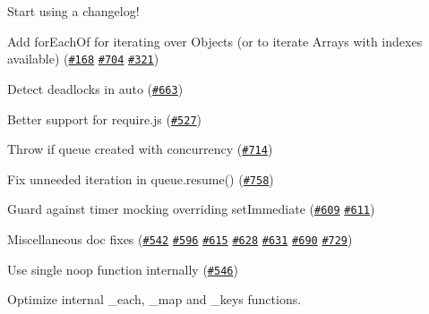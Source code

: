 \begin{DoxyItemize}
\item Start using a changelog!
\item Add {\ttfamily for\+Each\+Of} for iterating over Objects (or to iterate Arrays with indexes available) (\href{https://github.com/caolan/async/issues/168}{\tt \#168} \href{https://github.com/caolan/async/issues/704}{\tt \#704} \href{https://github.com/caolan/async/issues/321}{\tt \#321})
\item Detect deadlocks in {\ttfamily auto} (\href{https://github.com/caolan/async/issues/663}{\tt \#663})
\item Better support for require.\+js (\href{https://github.com/caolan/async/issues/527}{\tt \#527})
\item Throw if queue created with concurrency {} (\href{https://github.com/caolan/async/issues/714}{\tt \#714})
\item Fix unneeded iteration in {\ttfamily queue.\+resume()} (\href{https://github.com/caolan/async/issues/758}{\tt \#758})
\item Guard against timer mocking overriding {\ttfamily set\+Immediate} (\href{https://github.com/caolan/async/issues/609}{\tt \#609} \href{https://github.com/caolan/async/issues/611}{\tt \#611})
\item Miscellaneous doc fixes (\href{https://github.com/caolan/async/issues/542}{\tt \#542} \href{https://github.com/caolan/async/issues/596}{\tt \#596} \href{https://github.com/caolan/async/issues/615}{\tt \#615} \href{https://github.com/caolan/async/issues/628}{\tt \#628} \href{https://github.com/caolan/async/issues/631}{\tt \#631} \href{https://github.com/caolan/async/issues/690}{\tt \#690} \href{https://github.com/caolan/async/issues/729}{\tt \#729})
\item Use single noop function internally (\href{https://github.com/caolan/async/issues/546}{\tt \#546})
\item Optimize internal {\ttfamily \+\_\+each}, {\ttfamily \+\_\+map} and {\ttfamily \+\_\+keys} functions. 
\end{DoxyItemize}